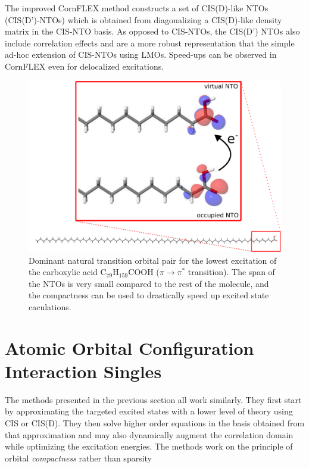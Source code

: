 The improved CornFLEX method constructs a set of CIS(D)-like NTOs (CIS(D')-NTOs) which is obtained from diagonalizing a CIS(D)-like density matrix in the CIS-NTO basis. As opposed to CIS-NTOs, the CIS(D') NTOs also include correlation effects and are a more robust representation that the simple ad-hoc extension of CIS-NTOs using LMOs. Speed-ups can be observed in CornFLEX even for delocalized excitations.


\begin{figure}
\centering
\includegraphics[scale=0.6]{Pics/NTOACID}
\caption{Dominant natural transition orbital pair for the lowest excitation of the carboxylic acid C$_{79}$H$_{159}$COOH ($\pi \rightarrow \pi^*$ transition). The span of the NTOs is very small compared to the rest of the molecule, and the compactness can be used to drastically speed up excited state caculations.}
\label{fig:NTO}
\end{figure}

\section{Atomic Orbital Configuration Interaction Singles}


The methods presented in the previous section all work similarly. They first start by approximating the targeted excited states with a lower level of theory using CIS or CIS(D). They then solve higher order equations in the basis obtained from that approximation and may also dynamically augment the correlation domain while optimizing the excitation energies. The methods work on the principle of orbital \emph{compactness} rather than sparsity

